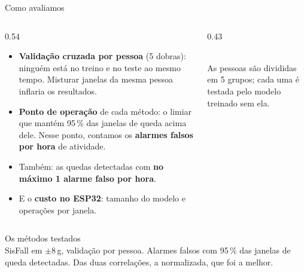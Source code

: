\documentclass[aspectratio=169,10pt]{beamer}
\newcommand{\nota}[1]{{\footnotesize\color{tinta2}#1}}
\begin{document}
\begin{frame}{Como avaliamos}
  \begin{columns}[T,onlytextwidth]
    \begin{column}{0.54\textwidth}
      \begin{itemize}
        \item \textbf{Validação cruzada por pessoa} (5 dobras): ninguém está no treino e no teste ao mesmo tempo.
              Misturar janelas da mesma pessoa inflaria os resultados.
        \item \textbf{Ponto de operação} de cada método: o limiar que mantém 95\,\% das janelas de queda acima
              dele. Nesse ponto, contamos os \textbf{alarmes falsos por hora} de atividade.
        \item Também: as quedas detectadas com \textbf{no máximo 1 alarme falso por hora}.
        \item E o \textbf{custo no ESP32}: tamanho do modelo e operações por janela.
      \end{itemize}
    \end{column}
    \begin{column}{0.43\textwidth}
      \centering
      \\[0.15cm]
      \nota{As \nPessoas{} pessoas são divididas em 5 grupos; cada uma é testada pelo modelo treinado sem ela.}
    \end{column}
  \end{columns}
\end{frame}

\begin{frame}{Os métodos testados}
  \centering
  {\scriptsize}\\[0.2cm]
  \nota{SisFall em $\pm$8\,g, validação por pessoa. Alarmes falsos com 95\,\% das janelas de queda detectadas. Das
        duas correlações, a normalizada, que foi a melhor.}
\end{frame}
\end{document}
